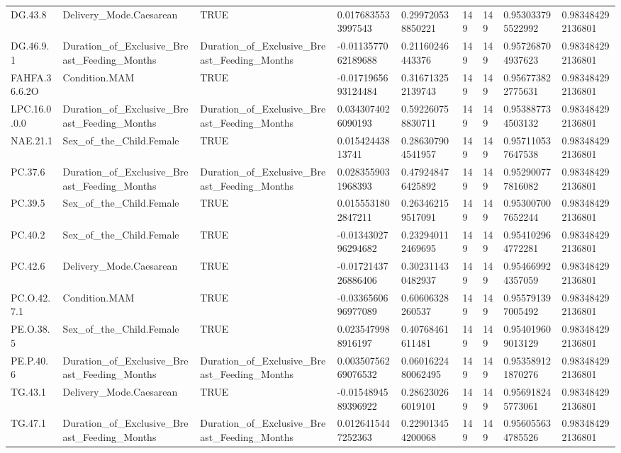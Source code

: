 \begin{longtable}{lllllllll}
DG.43.8 & Delivery\_Mode.Caesarean & TRUE & 0.0176835533997543 & 0.299720538850221 & 149 & 149 & 0.953033795522992 & 0.983484292136801 \\
DG.46.9.1 & Duration\_of\_Exclusive\_Breast\_Feeding\_Months & Duration\_of\_Exclusive\_Breast\_Feeding\_Months & -0.0113577062189688 & 0.21160246443376 & 149 & 149 & 0.957268704937623 & 0.983484292136801 \\
FAHFA.36.6.2O & Condition.MAM & TRUE & -0.0171965693124484 & 0.316713252139743 & 149 & 149 & 0.956773822775631 & 0.983484292136801 \\
LPC.16.0.0.0 & Duration\_of\_Exclusive\_Breast\_Feeding\_Months & Duration\_of\_Exclusive\_Breast\_Feeding\_Months & 0.0343074026090193 & 0.592260758830711 & 149 & 149 & 0.953887734503132 & 0.983484292136801 \\
NAE.21.1 & Sex\_of\_the\_Child.Female & TRUE & 0.01542443813741 & 0.286307904541957 & 149 & 149 & 0.957110537647538 & 0.983484292136801 \\
PC.37.6 & Duration\_of\_Exclusive\_Breast\_Feeding\_Months & Duration\_of\_Exclusive\_Breast\_Feeding\_Months & 0.0283559031968393 & 0.479248476425892 & 149 & 149 & 0.952900777816082 & 0.983484292136801 \\
PC.39.5 & Sex\_of\_the\_Child.Female & TRUE & 0.0155531802847211 & 0.263462159517091 & 149 & 149 & 0.953007007652244 & 0.983484292136801 \\
PC.40.2 & Sex\_of\_the\_Child.Female & TRUE & -0.0134302796294682 & 0.232940112469695 & 149 & 149 & 0.954102964772281 & 0.983484292136801 \\
PC.42.6 & Delivery\_Mode.Caesarean & TRUE & -0.0172143726886406 & 0.302311430482937 & 149 & 149 & 0.954669924357059 & 0.983484292136801 \\
PC.O.42.7.1 & Condition.MAM & TRUE & -0.0336560696977089 & 0.60606328260537 & 149 & 149 & 0.955791397005492 & 0.983484292136801 \\
PE.O.38.5 & Sex\_of\_the\_Child.Female & TRUE & 0.0235479988916197 & 0.40768461611481 & 149 & 149 & 0.954019609013129 & 0.983484292136801 \\
PE.P.40.6 & Duration\_of\_Exclusive\_Breast\_Feeding\_Months & Duration\_of\_Exclusive\_Breast\_Feeding\_Months & 0.00350756269076532 & 0.0601622480062495 & 149 & 149 & 0.953589121870276 & 0.983484292136801 \\
TG.43.1 & Delivery\_Mode.Caesarean & TRUE & -0.0154894589396922 & 0.286230266019101 & 149 & 149 & 0.956918245773061 & 0.983484292136801 \\
TG.47.1 & Duration\_of\_Exclusive\_Breast\_Feeding\_Months & Duration\_of\_Exclusive\_Breast\_Feeding\_Months & 0.0126415447252363 & 0.229013454200068 & 149 & 149 & 0.956055634785526 & 0.983484292136801 \\

\end{longtable}

